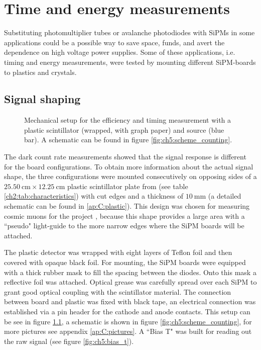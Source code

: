\chapter{Time and energy measurements} \label{ch:timing}
Substituting photomultiplier tubes or avalanche photodiodes with SiPMs in some applications could be a possible way to save space, funds, and avert the dependence on high voltage power supplies. Some of these applications, i.e. timing and energy measurements, were tested by mounting different SiPM-boards to plastics and crystals.     
\section{Signal shaping} \label{ch5:signal_shaping}
\begin{figure}[b!]
	\hfill
	\hfill
	\caption[Plastic scintillator measurement]{Mechanical setup for the efficiency and timing measurement with a plastic scintillator (wrapped, with graph paper) and \sr{} source (blue bar). A schematic can be found in figure \ref{fig:ch5:scheme_counting}.}
	\label{pic:ch5:plastic}
\end{figure}
The dark count rate measurements showed that the signal response is different for the board configurations. To obtain more information about the actual signal shape, the three configurations were mounted consecutively on opposing sides of a $\SI{25.50}{\centi\meter}\times\SI{12.25}{\centi\meter}$ plastic scintillator plate  from  (see table \ref{ch2:tab:characteristics}) with cut edges and a thickness of $\SI{10}{\milli\meter}$ (a detailed schematic can be found in \ref{ap:C:plastic}). This design was chosen for measuring cosmic muons for the project  \cite{schauer_projekt}, because this shape provides a large area with a ``pseudo" light-guide to the more narrow edges where the SiPM boards will be attached.\par   
The plastic detector was wrapped with eight layers of Teflon foil and then covered with opaque black foil. For mounting, the SiPM boards were equipped with a thick rubber mask to fill the spacing between the diodes. Onto this mask a reflective foil was attached. Optical grease was carefully spread over each SiPM to grant good optical coupling with the scintillator material. The connection between board and plastic was fixed with black tape, an electrical connection was established via a pin header for the cathode and anode contacts. This setup can be see in figure \ref{pic:ch5:plastic}, a schematic is shown in figure \ref{fig:ch5:scheme_counting}, for more pictures see appendix \ref{ap:C:pictures}. A ``Bias T" was built for reading out the raw signal (see figure \ref{fig:ch5:bias_t}).  \par
